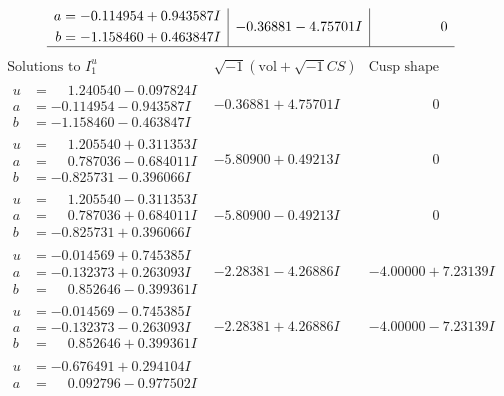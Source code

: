 \documentclass[1p]{elsarticle_modified}
\theoremstyle{definition}
\newcommand{\I}{\sqrt{-1}}
\begin{document}
$$\begin{array}{c|c|c}
\begin{aligned}
a &= -0.114954 + 0.943587 I \\
b &= -1.158460 + 0.463847 I\end{aligned}
 & -0.36881 - 4.75701 I & \phantom{-0.000000 } 0\\
 \hline 
 \end{array}$$\newpage$$\begin{array}{c|c|c}  
\text{Solutions to }I^u_{1}& \I (\text{vol} + \sqrt{-1}CS) & \text{Cusp shape}\\
 \hline 
\begin{aligned}
u &= \phantom{-}1.240540 - 0.097824 I \\
a &= -0.114954 - 0.943587 I \\
b &= -1.158460 - 0.463847 I\end{aligned}
 & -0.36881 + 4.75701 I & \phantom{-0.000000 } 0 \\ \hline\begin{aligned}
u &= \phantom{-}1.205540 + 0.311353 I \\
a &= \phantom{-}0.787036 - 0.684011 I \\
b &= -0.825731 - 0.396066 I\end{aligned}
 & -5.80900 + 0.49213 I & \phantom{-0.000000 } 0 \\ \hline\begin{aligned}
u &= \phantom{-}1.205540 - 0.311353 I \\
a &= \phantom{-}0.787036 + 0.684011 I \\
b &= -0.825731 + 0.396066 I\end{aligned}
 & -5.80900 - 0.49213 I & \phantom{-0.000000 } 0 \\ \hline\begin{aligned}
u &= -0.014569 + 0.745385 I \\
a &= -0.132373 + 0.263093 I \\
b &= \phantom{-}0.852646 - 0.399361 I\end{aligned}
 & -2.28381 - 4.26886 I & -4.00000 + 7.23139 I \\ \hline\begin{aligned}
u &= -0.014569 - 0.745385 I \\
a &= -0.132373 - 0.263093 I \\
b &= \phantom{-}0.852646 + 0.399361 I\end{aligned}
 & -2.28381 + 4.26886 I & -4.00000 - 7.23139 I \\ \hline\begin{aligned}
u &= -0.676491 + 0.294104 I \\
a &= \phantom{-}0.092796 - 0.977502 I \\

\end{aligned}
\end{array}$$
\end{document}
